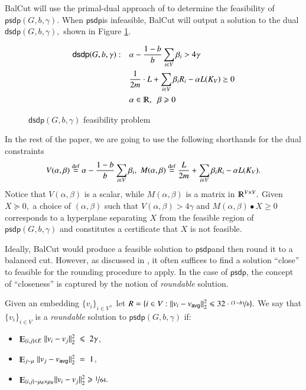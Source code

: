 \documentclass[twoside,leqno,twocolumn]{article}
\newcommand{\nfrac}{\nicefrac}
\renewcommand{\mathbb}{\varmathbb}
\renewcommand{\leq}{\leqslant}
\renewcommand{\geq}{\geqslant}
\newcommand{\norm}[1]{\lVert#1\rVert}
\newcommand{\defeq}{\stackrel{\textup{def}}{=}}
\newcommand{\R}{\mathbb R}
\newcommand{\Esymb}{\mathbb{E}}
\DeclareMathOperator*{\E}{\Esymb}
\numberwithin{equation}{section}
\newcommand{\psdp}{{\ensuremath{{\mathsf{psdp}}}\xspace}}
\newcommand{\dsdp}{{\ensuremath{\mathsf{dsdp}}\xspace}}
\newcommand{\alg}{{\sc BalCut}\xspace}
\newcommand{\avg}{{\ensuremath{\mathsf{avg}}\xspace}}
\begin{document}
\noindent
\alg will use the primal-dual approach of \cite{AK} to determine the feasibility of $\psdp(G,b, \gamma).$ When \psdp is infeasible, \alg will output a solution to  the dual $\dsdp(G,b,\gamma),$ shown in Figure \ref{fig:dspd}. 

\begin{figure}[htb]
\begin{alignat*}{4}
\dsdp(G,b,\gamma):\quad &  \alpha - \frac{1-b}{b} \sum_{i \in V} \beta_i > 4\gamma\\
 &  \frac{1}{2m} \cdot L + \sum_{i \in V} \beta_i R_i-\alpha L(K_V) \succeq 0\\
 & \alpha \in \R, \; \; \beta \geq 0 
\end{alignat*} \caption{$\dsdp(G,b,\gamma)$ feasibility problem}
\label{fig:dspd}
\end{figure} 
\noindent
In the rest of the paper, we are going to use the following shorthands for the dual constraints
$$
V(\alpha, \beta) \defeq  \alpha - \frac{1-b}{b} \sum_{i \in V} \beta_i  , \;
M(\alpha, \beta) \defeq \frac{L}{2m}  + \sum_{i \in V} \beta_i R_i -\alpha L(K_V).
$$
Notice that $V(\alpha, \beta)$ is a scalar, while $M(\alpha, \beta)$ is a matrix in $\mathbb{R}^{V \times V}.$
Given $X \succeq 0,$ a choice of $(\alpha, \beta)$ such that $V(\alpha, \beta) > 4\gamma$ and $M(\alpha, \beta) \bullet X \geq 0$ corresponds to a hyperplane separating $X$ from the feasible region of $\psdp(G,b,\gamma)$ and constitutes a certificate that $X$ is not feasible. 

\noindent
Ideally, \alg would produce a feasible solution to \psdp and then round it to a balanced cut. However, as discussed in \cite{AK}, it often suffices to find a solution ``close'' to feasible for the rounding procedure to apply. In the case of \psdp, the concept of ``closeness'' is captured by the notion of {\it roundable} solution.
\begin{Definition}\label{def:roundable}
 Given an embedding $\{v_i\}_{i \in V},$ let $R = \{i \in V : \norm{v_i - v_\avg}_2^2 \leq 32 \cdot \nfrac{(1-b)}{b}\}.$ We say that $\{v_i\}_{i \in V}$ is a {\it roundable} solution to $\psdp(G, b, \gamma)$ if:
\begin{itemize}
\item $\E_{\{i,j\} \in E}\;\norm{v_i-v_j}_2^2 \; \leq \; 2\gamma $,
\item $\E_{j \sim \mu}\; \norm{v_j- v_\avg}_2^2 \;= \;1 $,
\item $  \E_{\{i,j\} \sim \mu_R \times \mu_R }\norm{v_i - v_j}_2^2 \geq \nfrac{1}{64}.$
\end{itemize} 
\end{Definition}
\end{document}
